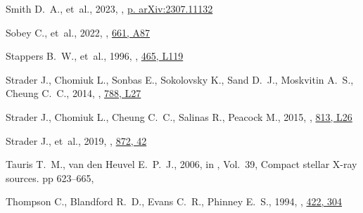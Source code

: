 \documentclass[fleqn,usenatbib]{mnras}
\begin{document}
\begin{thebibliography}{99}
{Smith} D.~A.,  et~al., 2023, , \href {https://ui.adsabs.harvard.edu/abs/2023arXiv230711132S} {p. arXiv:2307.11132}

{Sobey} C.,  et~al., 2022, , \href {https://ui.adsabs.harvard.edu/abs/2022A&A...661A..87S} {661, A87}

{Stappers} B.~W.,  et~al., 1996, , \href {https://ui.adsabs.harvard.edu/abs/1996ApJ...465L.119S} {465, L119}

{Strader} J.,  {Chomiuk} L.,  {Sonbas} E.,  {Sokolovsky} K.,  {Sand} D.~J.,  {Moskvitin} A.~S.,   {Cheung} C.~C.,  2014, , \href {https://ui.adsabs.harvard.edu/abs/2014ApJ...788L..27S} {788, L27}

{Strader} J.,  {Chomiuk} L.,  {Cheung} C.~C.,  {Salinas} R.,   {Peacock} M.,  2015, , \href {https://ui.adsabs.harvard.edu/abs/2015ApJ...813L..26S} {813, L26}

{Strader} J.,  et~al., 2019, , \href {https://ui.adsabs.harvard.edu/abs/2019ApJ...872...42S} {872, 42}

{Tauris} T.~M.,  {van den Heuvel} E.~P.~J.,  2006, in , Vol.~39, Compact stellar X-ray sources.
pp 623--665, 

{Thompson} C.,  {Blandford} R.~D.,  {Evans} C.~R.,   {Phinney} E.~S.,  1994, , \href {https://ui.adsabs.harvard.edu/abs/1994ApJ...422..304T} {422, 304}


\end{thebibliography}
\end{document}
